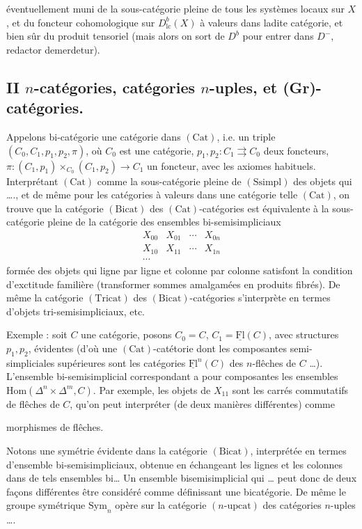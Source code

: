 \documentclass[11pt,a4paper]{article}
\begin{document}
éventuellement muni de la sous-catégorie pleine de tous les systèmes
locaux sur $X$, et du foncteur cohomologique sur $D^b_{\mathrm{lc}}(X)$ à
valeurs dans ladite catégorie, et bien sûr du produit tensoriel (mais alors
on sort de $D^b$ pour entrer dans $D^-$, redactor demerdetur).

\subsection*{II \quad $n$-catégories, catégories $n$-uples, et (Gr)-catégories.}

Appelons bi-catégorie une catégorie dans $(\mathrm{Cat})$, i.e. un triple
$(C_0, C_1, p_1, p_2, \pi)$, où $C_0$ est une catégorie,
$p_1, p_2 : C_1 \rightrightarrows C_0$ deux foncteurs,
$\pi : (C_1, p_1) \times_{C_0} (C_1, p_2) \to C_1$ un foncteur, avec les
axiomes habituels. Interprétant $(\mathrm{Cat})$ comme la sous-catégorie
pleine de $(\mathrm{Ssimpl})$ des objets qui …., et de même pour les
catégories à valeurs dans une catégorie telle $(\mathrm{Cat})$, on trouve
que la catégorie $(\mathrm{Bicat})$ des $(\mathrm{Cat})$-catégories
est équivalente à la sous-catégorie pleine de la catégorie des ensembles
bi-semisimpliciaux
\[
\begin{array}{cccc}
X_{00} & X_{01} & \cdots & X_{0n} \\
X_{10} & X_{11} & \cdots & X_{1n} \\
\cdots & & &
\end{array}
\]
formée des objets qui ligne par ligne et colonne par colonne satisfont la
condition d'exctitude familière (transformer sommes amalgamées en produits
fibrés). De même la catégorie $(\mathrm{Tricat})$ des
$(\mathrm{Bicat})$-catégories s'interprète en termes d'objets
tri-semisimpliciaux, etc.

Exemple : soit $C$ une catégorie, posons $C_0 = C$,
$C_1 = \underline{\mathrm{Fl}}(C)$, avec structures $p_1, p_2$, évidentes
(d'où une $(\mathrm{Cat})$-catétorie dont les composantes semi-simpliciales
supérieures sont les catégories $\underline{\mathrm{Fl}}^n(C)$ des
$n$-flêches de $C$ …). L'ensemble bi-semisimplicial correspondant a pour
composantes les ensembles $\mathrm{Hom}(\Delta^n \times \Delta^m, C)$. Par
exemple, les objets de $X_{11}$ sont les carrés commutatifs de flêches de
$C$, qu'on peut interpréter (de deux manières différentes) comme

morphismes de flêches.

Notons une symétrie évidente dans la catégorie $(\mathrm{Bicat})$,
interprétée en termes d'ensemble bi-semisimpliciaux, obtenue en échangeant
les lignes et les colonnes dans de tels ensembles bi… Un ensemble
bisemisimplicial qui … peut donc de deux façons différentes être considéré
comme définissant une bicatégorie. De même le groupe symétrique
$\mathrm{Sym}_n$ opère sur la catégorie $(n\text{-upcat})$ des catégories
$n$-uples ….
\end{document}
